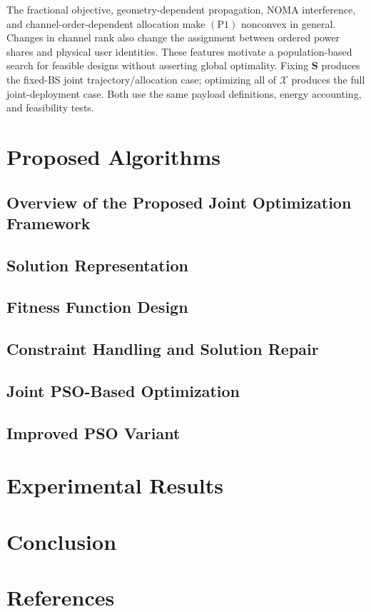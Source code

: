 \documentclass[conference]{IEEEtran}
\begin{document}
The fractional objective, geometry-dependent propagation, NOMA interference, and channel-order-dependent allocation make $(\mathrm{P1})$ nonconvex in general. Changes in channel rank also change the assignment between ordered power shares and physical user identities. These features motivate a population-based search for feasible designs without asserting global optimality. Fixing $\bm S$ produces the fixed-BS joint trajectory/allocation case; optimizing all of $\mathcal X$ produces the full joint-deployment case. Both use the same payload definitions, energy accounting, and feasibility tests.

\section{Proposed Algorithms}
\label{sec:algorithms}
\subsection{Overview of the Proposed Joint Optimization Framework}
\label{subsec:algorithm_overview}
\subsection{Solution Representation}
\label{subsec:solution_representation}
\subsection{Fitness Function Design}
\label{subsec:fitness_function}
\subsection{Constraint Handling and Solution Repair}
\label{subsec:constraint_handling}
\subsection{Joint PSO-Based Optimization}
\label{subsec:joint_pso}
\subsection{Improved PSO Variant}
\label{subsec:improved_pso}

\section{Experimental Results}
\label{sec:results}

\section{Conclusion}
\label{sec:conclusion}

\section*{References}
\end{document}
